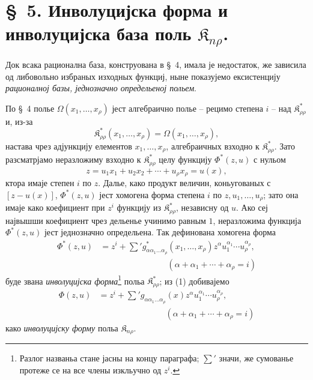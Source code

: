 ﻿\documentclass[11pt]{article}
\providecommand{\Kfield}{\mathfrak{K}}
\begin{document}
\section*{\S\ 5. Инволуцијска форма и инволуцијска база поль $\Kfield_{n\rho}$.}

Док всака рационална база, конструована в \S\ 4, имала је недостаток, же зависила од либовольно избраных изходных функциј, ныне показујемо ексистенцију {\itshape рационалној базы, једнозначно определьеној польем}.

По \S\ 4 полье $\Omega(x_1,\ldots,x_\rho)$ јест алгебраично полье -- рецимо степена $i$ -- над $\Kfield^*_{\rho\rho}$ и, из-за
\[
  \Kfield^*_{\rho\rho}(x_1,
  \ldots,x_\rho)=\Omega(x_1,\ldots,x_\rho),
\]
настава чрез адјункцију елементов $x_1,\ldots,x_\rho$, алгебраичных взходно к $\Kfield^*_{\rho\rho}$. Зато разсматрјамо неразложиму взходно к $\Kfield^*_{\rho\rho}$ целу функцију $\Phi^*(z,u)$ с нульом
\[
  z=u_1x_1+u_2x_2+\cdots+u_\rho x_\rho=u(x),
\]
ктора имаје степен $i$ по $z$. Далье, како продукт величин, коньугованых с $[z-u(x)]$, $\Phi^*(z,u)$ јест хомогена форма степена $i$ по $z,u_1,\ldots,u_\rho$; зато она имаје како коефициент при $z^i$ функцију из $\Kfield^*_{\rho\rho}$, независну од $u$. Ако сеј највышши коефициент чрез дельенье учинимо равным $1$, неразложима функција $\Phi^*(z,u)$ јест једнозначно определьена. Так дефинована хомогена форма
\begin{equation}
\begin{aligned}
  \Phi^*(z,u)
  &=z^i+
    \sum{}' g^*_{\alpha\alpha_1\ldots\alpha_\rho}(x_1,
    \ldots,x_\rho)
    z^\alpha u_1^{\alpha_1}\cdots u_\rho^{\alpha_\rho},\\
  &\hspace{8em}(\alpha+\alpha_1+\cdots+\alpha_\rho=i)
\end{aligned}
\tag{1}
\end{equation}
буде звана {\itshape инволуцијска форма}\footnote{Разлог названьа стане јасны на концу параграфа; $\sum'$ значи, же сумованье протеже се на все члены изкльучно од $z^i$.} польа $\Kfield^*_{\rho\rho}$; из (1) добивајемо
\begin{equation}
\begin{aligned}
  \Phi(z,u)
  &=z^i+
    \sum{}' g_{\alpha\alpha_1\ldots\alpha_\rho}(x)
    z^\alpha u_1^{\alpha_1}\cdots u_\rho^{\alpha_\rho},\\
  &\hspace{8em}(\alpha+\alpha_1+\cdots+\alpha_\rho=i)
\end{aligned}
\tag{2}
\end{equation}
како {\itshape инволуцијску форму} польа $\Kfield_{n\rho}$.
\end{document}
